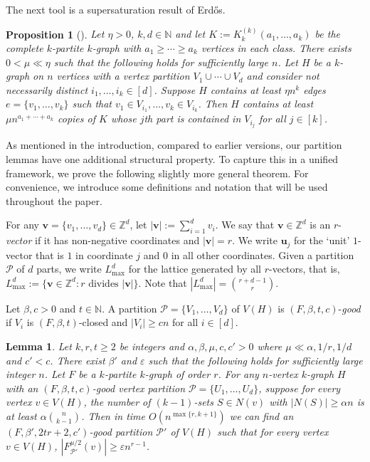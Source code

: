 \documentclass[11pt, letterpaper]{amsart}
\theoremstyle{plain}
\numberwithin{equation}{section}
\newtheorem{lemma}[thm]{Lemma}
\newtheorem{proposition}[thm]{Proposition}
\theoremstyle{definition}
\newcommand\card[1]{\left| #1 \right|}
\renewcommand{\vec}[1]{{\mathbf #1}}
\begin{document}
    The next tool is a supersaturation result of Erd\H{o}s.

\begin{proposition}[\cite{erdos1964extremal}]\label{supersaturation}
Let $\eta>0$, $k,d\in\mathbb{N}$ and let $K:=K_k^{(k)}(a_1,\dots,a_k)$ be the complete $k$-partite $k$-graph with $a_1\ge\cdots\ge a_k$ vertices in each class. 
There exists $0<\mu\ll\eta$ such that the following holds for sufficiently large $n$. 
Let $H$ be a $k$-graph on $n$ vertices with a vertex partition $V_1\cup\cdots \cup V_d$ and consider not necessarily distinct $i_1,\dots,i_k\in [d]$. 
Suppose $H$ contains at least $\eta n^k$ edges $e=\{v_1,\dots,v_k\}$ such that $v_1\in V_{i_1},\dots,v_k \in V_{i_k}$. Then $H$ contains at least $\mu n^{a_1+\cdots+a_k}$ copies of $K$ whose $j$th part is contained in $V_{i_j}$ for all $j \in [k]$.
\end{proposition}

As mentioned in the introduction, compared to earlier versions, our partition lemmas have one additional structural property. 
To capture this in a unified framework, we prove the following slightly more general theorem. 
For convenience, we introduce some definitions  and notation that will be used throughout the paper. 

For any \(\vec{v} = \{v_1, \ldots, v_d\} \in \mathbb{Z}^d\), let \(|\vec{v}| := \sum_{i=1}^d v_i\). We say that \(\vec{v} \in \mathbb{Z}^d\) is an \(r\)-\emph{vector} if it has non-negative coordinates and \(|\vec{v}| = r\). We write \(\vec{u}_j\) for the `unit' \(1\)-vector that is \(1\) in coordinate \(j\) and \(0\) in all other coordinates. Given a partition \(\mathcal{P}\) of \(d\) parts, we write \(L^d_{\text{max}}\) for the lattice generated by all \(r\)-vectors, that is, \(L^d_{\text{max}} := \{\mathbf{v} \in \mathbb{Z}^d : r \text{ divides } |\mathbf{v}|\}.\) Note that \(\card{L^d_{\text{max}}}= \binom{r+d-1}{r}\).

Let \(\beta, c>0\) and \(t\in\mathbb{N}\). A partition \(\mathcal{P}=\{V_1,\ldots,V_d\}\) of \(V(H)\) is \((F,\beta,t,c)\)-\emph{good} if \(V_i\) is \((F,\beta,t)\)-closed and \(\card{V_i}\ge cn\) for all \(i\in [d]\). 


	
\begin{lemma}\label{better partition}
Let $k,r,t\ge 2$ be integers and $\alpha,\beta,\mu,c,c'>0$ where $\mu\ll \alpha,1/r,1/d$ and $c'<c$.
There exist $\beta'$ and $\varepsilon$ such that the following holds for sufficiently large integer $n$. %
Let $F$ be a $k$-partite $k$-graph of order $r$. 
For any $n$-vertex $k$-graph $H$ with an $(F,\beta,t,c)$-good vertex partition $\mathcal{P}=\{U_1,\dots,U_d\}$, suppose for every vertex $v\in V(H)$, the number of $(k-1)$-sets $S\in N(v)$ with $|N(S)|\ge \alpha n$ is at least $\alpha\binom{n}{k-1}$. Then in time $O(n^{\max\{r,k+1\}})$ we can find an $(F,\beta',2tr+2,c')$-good partition $\mathcal{P}'$ of $V(H)$ such that for every vertex $v\in V(H)$, $ \card{F^{\mu/2}_{\mathcal{P}'}(v)}\ge \varepsilon n^{r-1} $.
\end{lemma}
\end{document}
